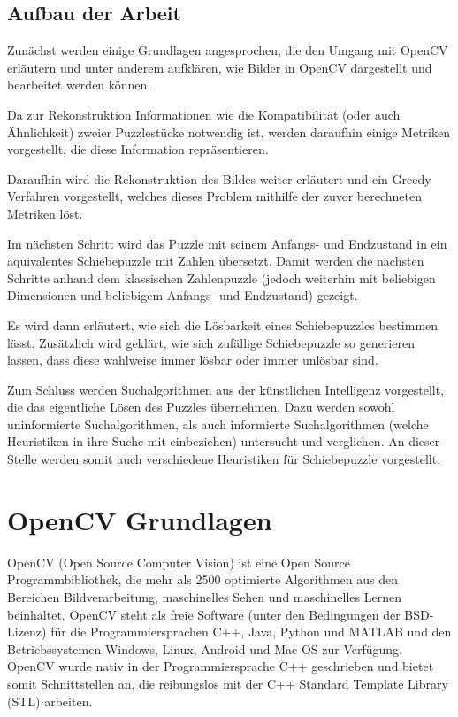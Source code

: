 \documentclass{whswinvcbook}
\begin{document}
\section{Aufbau der Arbeit}
Zunächst werden einige Grundlagen angesprochen, die den Umgang mit OpenCV erläutern und unter anderem aufklären, wie Bilder in OpenCV dargestellt und bearbeitet werden können.

Da zur Rekonstruktion Informationen wie die Kompatibilität (oder auch Ähnlichkeit) zweier Puzzlestücke notwendig ist, werden daraufhin einige Metriken vorgestellt, die diese Information repräsentieren.

Daraufhin wird die Rekonstruktion des Bildes weiter erläutert und ein Greedy Verfahren vorgestellt, welches dieses Problem mithilfe der zuvor berechneten Metriken löst.

Im nächsten Schritt wird das Puzzle mit seinem Anfangs- und Endzustand in ein äquivalentes Schiebepuzzle mit Zahlen übersetzt. Damit werden die nächsten Schritte anhand dem klassischen Zahlenpuzzle (jedoch weiterhin mit beliebigen Dimensionen und beliebigem Anfangs- und Endzustand) gezeigt.

Es wird dann erläutert, wie sich die Lösbarkeit eines Schiebepuzzles bestimmen lässt. Zusätzlich wird geklärt, wie sich zufällige Schiebepuzzle so generieren lassen, dass diese wahlweise immer lösbar oder immer unlösbar sind.

Zum Schluss werden Suchalgorithmen aus der künstlichen Intelligenz vorgestellt, die das eigentliche Lösen des Puzzles übernehmen. Dazu werden sowohl uninformierte Suchalgorithmen, als auch informierte Suchalgorithmen (welche Heuristiken in ihre Suche mit einbeziehen) untersucht und verglichen. An dieser Stelle werden somit auch verschiedene Heuristiken für Schiebepuzzle vorgestellt.
\chapter{OpenCV Grundlagen}
OpenCV (Open Source Computer Vision) ist eine Open Source Programmbibliothek, die mehr als 2500 optimierte Algorithmen aus den Bereichen Bildverarbeitung, maschinelles Sehen und maschinelles Lernen beinhaltet.\cite{opencv} OpenCV steht als freie Software (unter den Bedingungen der BSD-Lizenz) für die Programmiersprachen C++, Java, Python und MATLAB und den Betriebssystemen Windows, Linux, Android und Mac OS zur Verfügung. OpenCV wurde nativ in der Programmiersprache C++ geschrieben und bietet somit Schnittstellen an, die reibungslos mit der C++ Standard Template Library (STL) arbeiten.
\end{document}

